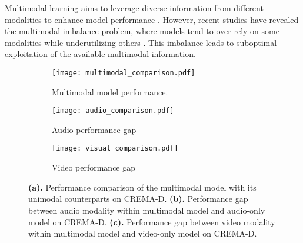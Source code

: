 \label{subsec:imbalance}
Multimodal learning aims to leverage diverse information from different modalities to enhance model performance \cite{Bal_MM}. However, recent studies have revealed the multimodal imbalance problem, where models tend to over-rely on some modalities while underutilizing others \cite{OGM_CVPR}. This imbalance leads to suboptimal exploitation of the available multimodal information.
\begin{figure}[t]
  \centering
  \begin{subfigure}[t]{0.96\linewidth}
    \centering
    \texttt{[image: multimodal\_comparison.pdf]} 
    \caption{Multimodal model performance.}
    \label{fig:multimodal_comparison}
  \end{subfigure}
  \vspace{-5pt} 
  \begin{subfigure}[t]{0.48\linewidth} 
    \centering
    \texttt{[image: audio\_comparison.pdf]}
    \caption{Audio performance gap}
    \label{fig:audio_comparison}
  \end{subfigure}%
  \hfill
  \begin{subfigure}[t]{0.48\linewidth}
    \centering
    \texttt{[image: visual\_comparison.pdf]}
    \caption{Video performance gap}
    \label{fig:visual_comparison}
  \end{subfigure}
  \caption{\textbf{(a).}  Performance comparison of the multimodal model with its unimodal counterparts on CREMA-D. \textbf{(b).} Performance gap between audio modality within multimodal model and audio-only model on CREMA-D. \textbf{(c).} Performance gap between video modality within multimodal model and video-only model on CREMA-D.}
  \vspace{-10pt} 
  \label{fig:imbalance illustration}
\end{figure}

